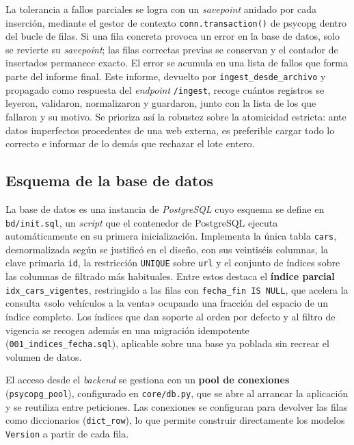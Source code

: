 La tolerancia a fallos parciales se logra con un \emph{savepoint} anidado por cada
inserción, mediante el gestor de contexto \texttt{conn.transaction()} de psycopg
dentro del bucle de filas. Si una fila concreta provoca un error en la base de
datos, solo se revierte su \emph{savepoint}; las filas correctas previas se
conservan y el contador de insertados permanece exacto. El error se acumula en una
lista de fallos que forma parte del informe final. Este informe, devuelto por
\texttt{ingest\_desde\_archivo} y propagado como respuesta del \emph{endpoint}
\texttt{/ingest}, recoge cuántos registros se leyeron, validaron, normalizaron y
guardaron, junto con la lista de los que fallaron y su motivo. Se prioriza así la
robustez sobre la atomicidad estricta: ante datos imperfectos procedentes de una
web externa, es preferible cargar todo lo correcto e informar de lo demás que
rechazar el lote entero.

\subsection{Esquema de la base de datos}
\label{sec:impl-bd}

La base de datos es una instancia de \emph{PostgreSQL} cuyo esquema se define en
\texttt{bd/init.sql}, un \emph{script} que el contenedor de PostgreSQL ejecuta
automáticamente en su primera inicialización. Implementa la única tabla
\texttt{cars}, desnormalizada según se justificó en el diseño, con sus
veintiséis columnas, la clave primaria \texttt{id}, la restricción
\texttt{UNIQUE} sobre \texttt{url} y el conjunto de índices sobre las columnas de
filtrado más habituales. Entre estos destaca el \textbf{índice parcial}
\texttt{idx\_cars\_vigentes}, restringido a las filas con \texttt{fecha\_fin IS
NULL}, que acelera la consulta «solo vehículos a la venta» ocupando una fracción
del espacio de un índice completo. Los índices que dan soporte al orden por
defecto y al filtro de vigencia se recogen además en una migración idempotente
(\texttt{001\_indices\_fecha.sql}), aplicable sobre una base ya poblada sin
recrear el volumen de datos.

El acceso desde el \emph{backend} se gestiona con un \textbf{pool de conexiones}
(\texttt{psycopg\_pool}), configurado en \texttt{core/db.py}, que se abre al
arrancar la aplicación y se reutiliza entre peticiones. Las conexiones se
configuran para devolver las filas como diccionarios (\texttt{dict\_row}), lo que
permite construir directamente los modelos \texttt{Version} a partir de cada
fila.

